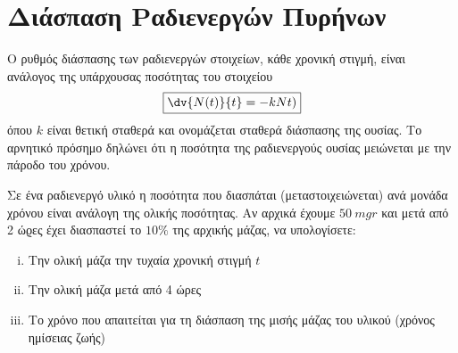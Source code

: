 \section*{Διάσπαση Ραδιενεργών Πυρήνων}

Ο ρυθμός διάσπασης των ραδιενεργών στοιχείων, κάθε χρονική στιγμή, είναι ανάλογος της 
υπάρχουσας ποσότητας του στοιχείου
\[
  \boxed{\dv{N(t)}{t} = -k Nt)}
\] 
όπου $k$ είναι θετική σταθερά και ονομάζεται σταθερά διάσπασης της ουσίας. Το αρνητικό 
πρόσημο δηλώνει ότι η ποσότητα της ραδιενεργούς ουσίας μειώνεται με την πάροδο του 
χρόνου.

\begin{problem}
  Σε ένα ραδιενεργό υλικό η ποσότητα που διασπάται (μεταστοιχειώνεται) ανά μονάδα 
  χρόνου είναι ανάλογη της ολικής ποσότητας. Αν αρχικά έχουμε $ \SI{50}{mgr} $ και 
  μετά από 2 ώϱες έχει διασπαστεί το $ 10 \% $ της αρχικής μάζας, να υπολογίσετε:
  \begin{enumerate}[i)]
    \item Την ολική μάζα την τυχαία χρονική στιγμή $t$ 
    \item Την ολική μάζα μετά από 4 ώρες
    \item Το χρόνο που απαιτείται για τη διάσπαση της μισής μάζας του υλικού (χρόνος
      ημίσειας ζωής)
  \end{enumerate}
\end{problem}
